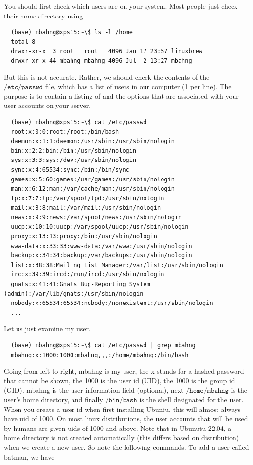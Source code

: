   You should first check which users are on your system. Most people just check their home directory using 
  \begin{lstlisting}
  (base) mbahng@xps15:~\$ ls -l /home
  total 8
  drwxr-xr-x  3 root   root   4096 Jan 17 23:57 linuxbrew
  drwxr-xr-x 44 mbahng mbahng 4096 Jul  2 13:27 mbahng
  \end{lstlisting}
  But this is not accurate. Rather, we should check the contents of the $\texttt{/etc/passwd}$ file, which has a list of users in our computer (1 per line). The purpose is to contain a listing of and the options that are associated with your user accounts on your server. 
  \begin{lstlisting}
  (base) mbahng@xps15:~\$ cat /etc/passwd
  root:x:0:0:root:/root:/bin/bash
  daemon:x:1:1:daemon:/usr/sbin:/usr/sbin/nologin
  bin:x:2:2:bin:/bin:/usr/sbin/nologin
  sys:x:3:3:sys:/dev:/usr/sbin/nologin
  sync:x:4:65534:sync:/bin:/bin/sync
  games:x:5:60:games:/usr/games:/usr/sbin/nologin
  man:x:6:12:man:/var/cache/man:/usr/sbin/nologin
  lp:x:7:7:lp:/var/spool/lpd:/usr/sbin/nologin
  mail:x:8:8:mail:/var/mail:/usr/sbin/nologin
  news:x:9:9:news:/var/spool/news:/usr/sbin/nologin
  uucp:x:10:10:uucp:/var/spool/uucp:/usr/sbin/nologin
  proxy:x:13:13:proxy:/bin:/usr/sbin/nologin
  www-data:x:33:33:www-data:/var/www:/usr/sbin/nologin
  backup:x:34:34:backup:/var/backups:/usr/sbin/nologin
  list:x:38:38:Mailing List Manager:/var/list:/usr/sbin/nologin
  irc:x:39:39:ircd:/run/ircd:/usr/sbin/nologin
  gnats:x:41:41:Gnats Bug-Reporting System (admin):/var/lib/gnats:/usr/sbin/nologin
  nobody:x:65534:65534:nobody:/nonexistent:/usr/sbin/nologin
  ...
  \end{lstlisting}
  Let us just examine my user. 
  \begin{lstlisting}
  (base) mbahng@xps15:~\$ cat /etc/passwd | grep mbahng
  mbahng:x:1000:1000:mbahng,,,:/home/mbahng:/bin/bash
  \end{lstlisting}
  Going from left to right, mbahng is my user, the x stands for a hashed password that cannot be shown, the 1000 is the user id (UID), the 1000 is the group id (GID), mbahng is the user information field (optional), next $\texttt{/home/mbahng}$ is the user's home directory, and finally $\texttt{/bin/bash}$ is the shell designated for the user. When you create a user id when first installing Ubuntu, this will almost always have uid of 1000. On most linux distributions, the user accounts that will be used by humans are given uids of 1000 and above. Note that in Ubunutu 22.04, a home directory is not created automatically (this differs based on distribution) when we create a new user. So note the following commands. To add a user called batman, we have 
